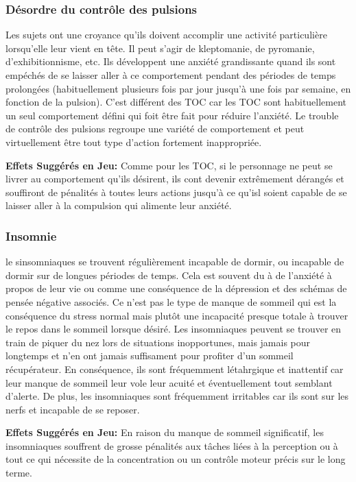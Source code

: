 \subsubsection{Désordre du contrôle des pulsions} 

Les sujets ont une croyance qu'ils doivent accomplir une activité particulière lorsqu'elle leur vient en tête. Il peut s'agir de kleptomanie, de pyromanie, d'exhibitionnisme, etc. Ils développent une anxiété grandissante quand ils sont empéchés de se laisser aller à ce comportement pendant des périodes de temps prolongées (habituellement plusieurs fois par jour jusqu'à une fois par semaine, en fonction de la pulsion). C'est différent des TOC car les TOC sont habituellement un seul comportement défini qui foit être fait pour réduire l'anxiété. Le trouble de contrôle des pulsions regroupe une variété de comportement et peut virtuellement être tout type d'action fortement inappropriée. 

\textbf{Effets Suggérés en Jeu:} Comme pour les TOC, si le personnage ne peut se livrer au comportement qu'ils désirent, ils cont devenir extrêmement dérangés et souffiront de pénalités à toutes leurs actions jusqu'à ce qu'isl soient capable de se laisser aller à la compulsion qui alimente leur anxiété. 

\subsubsection{Insomnie} 

le sinsomniaques se trouvent régulièrement incapable de dormir, ou incapable de dormir sur de longues périodes de temps. Cela est souvent du à de l'anxiété à propos de leur vie ou comme une conséquence de la dépression et des schémas de pensée négative associés. Ce n'est pas le type de manque de sommeil qui est la conséquence du stress normal mais plutôt une incapacité presque totale à trouver le repos dans le sommeil lorsque désiré. Les insomniaques peuvent se trouver en train de piquer du nez lors de situations inopportunes, mais jamais pour longtemps et n'en ont jamais suffisament pour profiter d'un sommeil récupérateur. En conséquence, ils sont fréquemment létahrgique et inattentif car leur manque de sommeil leur vole leur acuité et éventuellement tout semblant d'alerte. De plus, les insomniaques sont fréquemment irritables car ils sont sur les nerfs et incapable de se reposer. 

\textbf{Effets Suggérés en Jeu: }En raison du manque de sommeil significatif, les insomniaques souffrent de grosse pénalités aux tâches liées à la perception ou à tout ce qui nécessite de la concentration ou un contrôle moteur précis sur le long terme. 

